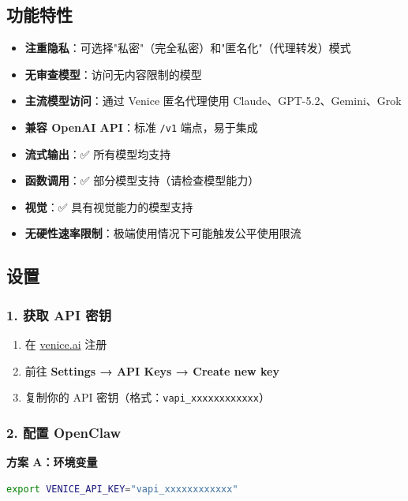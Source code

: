\subsection{功能特性}


\begin{itemize}
  \item \textbf{注重隐私}：可选择"私密"（完全私密）和"匿名化"（代理转发）模式
  \item \textbf{无审查模型}：访问无内容限制的模型
  \item \textbf{主流模型访问}：通过 Venice 匿名代理使用 Claude、GPT-5.2、Gemini、Grok
  \item \textbf{兼容 OpenAI API}：标准 \texttt{/v1} 端点，易于集成
  \item \textbf{流式输出}：✅ 所有模型均支持
  \item \textbf{函数调用}：✅ 部分模型支持（请检查模型能力）
  \item \textbf{视觉}：✅ 具有视觉能力的模型支持
  \item \textbf{无硬性速率限制}：极端使用情况下可能触发公平使用限流
\end{itemize}


\subsection{设置}


\subsubsection{1. 获取 API 密钥}


\begin{enumerate}
  \item 在 \href{https://venice.ai}{venice.ai} 注册
  \item 前往 \textbf{Settings → API Keys → Create new key}
  \item 复制你的 API 密钥（格式：\texttt{vapi\_xxxxxxxxxxxx}）
\end{enumerate}


\subsubsection{2. 配置 OpenClaw}


\textbf{方案 A：环境变量}

\begin{lstlisting}[language=bash]
export VENICE_API_KEY="vapi_xxxxxxxxxxxx"
\end{lstlisting}


